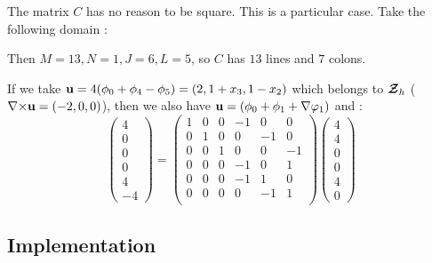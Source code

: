 \begin{rk}\label{squareC}
The matrix $C$ has no reason to be square. This is a particular case. Take
the following domain :
\begin{figure}[H]
\centering
{}
\end{figure}
Then $M=13,N=1,J=6,L=5$, so $C$ has $13$ lines and $7$ colons.
\end{rk}

If we take ${\mathbf{u}}=4(\phi_0+\phi_4-\phi_5)=(2,1+x_3,1-x_2)$ which belongs to
${\bm{\mathcal{Z}}}_h$ (${\nabla\times}{\mathbf{u}}=(-2,0,0)$), then we
also have ${\mathbf{u}}=(\phi_0+\phi_1+{\nabla}\varphi_1)$ and :
\[ \begin{pmatrix}
4\\0\\0\\0\\4\\-4
\end{pmatrix} = \begin{pmatrix}
1 & 0 & 0 & -1 & 0 & 0\\
0 & 1 & 0 & 0 & -1 & 0\\
0 & 0 & 1 & 0 & 0 & -1\\
0 & 0 & 0 & -1 & 0 & 1\\
0 & 0 & 0 & -1 & 1 & 0\\
0 & 0 & 0 & 0 & -1 & 1\\
\end{pmatrix} \begin{pmatrix}
4\\4\\0\\0\\4\\0
\end{pmatrix} \]

\subsection{Implementation}
